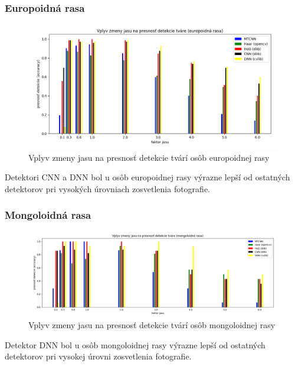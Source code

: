 \documentclass[]{article}
\begin{document}
	\subsubsection*{Europoidná rasa}
	
	\begin{figure}[h!]
		\includegraphics[width=\textwidth]{Vysledky_jas/europ/Figure_1.png}
		\caption{Vplyv zmeny jasu na presnosť detekcie tvárí osôb europoidnej rasy}
	\end{figure}

	Detektori CNN a DNN bol u osôb europoidnej rasy výrazne lepší od ostatných detektorov pri vysokých úrovniach zosvetlenia fotografie.

	\subsubsection*{Mongoloidná rasa}
	\begin{figure}[h!]
		\includegraphics[width=\textwidth]{Vysledky_jas/mongo/Figure_1.png}
		\caption{Vplyv zmeny jasu na presnosť detekcie tvárí osôb mongoloidnej rasy}
	\end{figure}

	Detektor DNN bol u osôb mongoloidnej rasy výrazne lepší od ostatných detektorov pri vysokej úrovni zosvetlenia fotografie.

	\newpage
\end{document}
